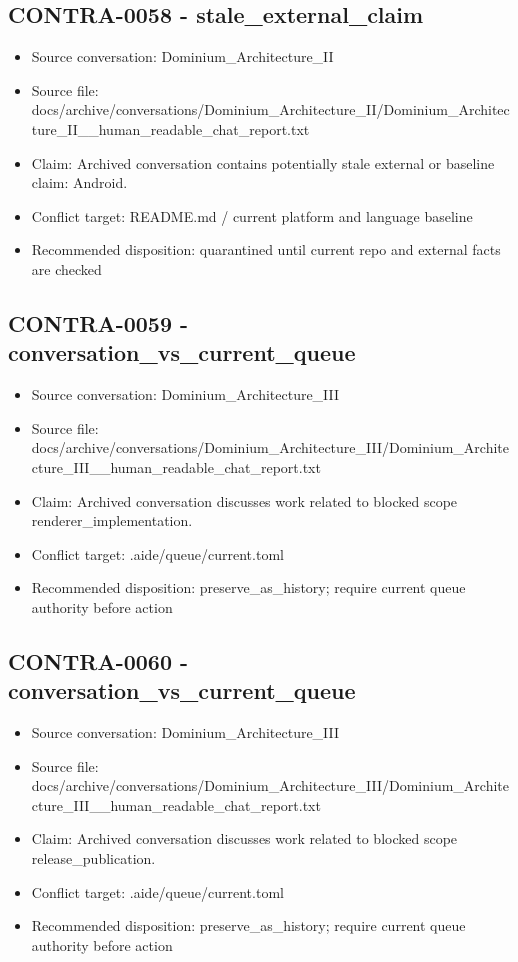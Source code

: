 \documentclass[11pt,a4paper]{report}
\begin{document}
\subsection{CONTRA-0058 - stale\_external\_claim}

\begin{itemize}
\item Source conversation: Dominium\_Architecture\_II
\item Source file: docs/archive/conversations/Dominium\_Architecture\_II/Dominium\_Architecture\_II\_\_human\_readable\_chat\_report.txt
\item Claim: Archived conversation contains potentially stale external or baseline claim: Android.
\item Conflict target: README.md / current platform and language baseline
\item Recommended disposition: quarantined until current repo and external facts are checked
\end{itemize}

\subsection{CONTRA-0059 - conversation\_vs\_current\_queue}

\begin{itemize}
\item Source conversation: Dominium\_Architecture\_III
\item Source file: docs/archive/conversations/Dominium\_Architecture\_III/Dominium\_Architecture\_III\_\_human\_readable\_chat\_report.txt
\item Claim: Archived conversation discusses work related to blocked scope renderer\_implementation.
\item Conflict target: .aide/queue/current.toml
\item Recommended disposition: preserve\_as\_history; require current queue authority before action
\end{itemize}

\subsection{CONTRA-0060 - conversation\_vs\_current\_queue}

\begin{itemize}
\item Source conversation: Dominium\_Architecture\_III
\item Source file: docs/archive/conversations/Dominium\_Architecture\_III/Dominium\_Architecture\_III\_\_human\_readable\_chat\_report.txt
\item Claim: Archived conversation discusses work related to blocked scope release\_publication.
\item Conflict target: .aide/queue/current.toml
\item Recommended disposition: preserve\_as\_history; require current queue authority before action
\end{itemize}
\end{document}
